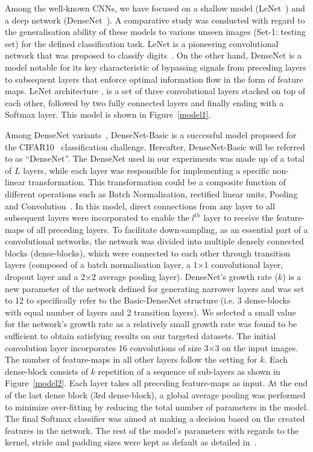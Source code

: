 \documentclass[a4paper,num-refs]{oup-contemporary}
\begin{document}
Among the well-known CNNs, we have focused on a shallow model (LeNet~\cite{lecun2015deep}) and a deep network (DenseNet~\cite{huang2017densely}). A comparative study was conducted with regard to the generalisation ability of these models to various unseen images (Set-1: testing set) for the defined classification task. 
LeNet is a pioneering convolutional network that was proposed to classify digits~\cite{lecun2015deep}. On the other hand, DenseNet is a model notable for its key characteristic of bypassing signals from  preceding layers to  subsequent layers that enforce optimal information flow in the form of feature maps.
LeNet architecture \cite{lecun1998gradient}, is a set of three convolutional layers stacked on top of each other, followed by two fully connected layers and finally ending with a Softmax layer. This model is shown in Figure~\ref{model1}.

Among  DenseNet variants~\cite{huang2017densely}, DenseNet-Basic is a successful model proposed for the CIFAR10~\cite{krizhevsky2009learning} classification challenge. Hereafter, DenseNet-Basic will be referred to as ``DenseNet''. 
The  DenseNet  used  in  our  experiments was   made up of a total  of $L$ layers, while each layer was responsible for  implementing a specific non-linear transformation. This transformation could be a composite function of different  operations  such as Batch Normalisation, rectified linear units, Pooling and Convolution~\cite{lecun2015deep, huang2017densely}. In this model, direct connections from any layer to all subsequent layers were incorporated to enable the $l^{th}$ layer to receive the feature-maps of all preceding layers.
To facilitate down-sampling, as an essential part of a convolutional networks, the network was divided into multiple densely connected blocks (dense-blocks), which were connected to each other through transition layers (composed of a batch normalisation layer, a 1$\times$1 convolutional layer, dropout  layer and a 2$\times$2 average pooling layer). DenseNet's growth rate ($k$) is a new parameter of the network defined for generating narrower layers and was set to 12 to specifically refer to the Basic-DenseNet structure (i.e.  3 dense-blocks with equal number of layers and 2 transition layers).  We selected a small value for the network's growth rate as a relatively small growth rate was found to be sufficient to obtain satisfying results on our targeted datasets.
The initial convolution layer  incorporates  16 convolutions of size 3$\times$3 on  the  input  images. The number of feature-maps in all other layers follow the setting for $k$. Each dense-block consists of $k$ repetition of a sequence of sub-layers as shown in Figure~\ref{model2}. Each layer takes all preceding feature-maps as input. At the end of the last dense block (3rd dense-block), a global average pooling was performed  to minimize over-fitting by reducing the total number of parameters in the model. The final Softmax classifier was aimed at making a decision based on the created features in the network. The rest of the model's parameters with regards to the kernel, stride and padding sizes were kept as default as detailed in~\cite{huang2017densely}. 
\end{document}
